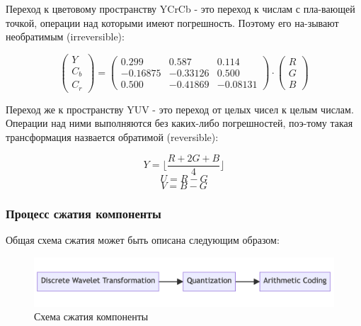 \documentclass[a4paper]{article}
\begin{document}
  Переход к цветовому пространству YCrCb - это переход к числам с пла-вающей точкой,
  операции над которыми имеют погрешность. Поэтому его на-зывают необратимым (irreversible):

  \begin{equation}
    \begin{pmatrix}
      Y \\ C_b \\ C_r
    \end{pmatrix} = \begin{pmatrix}
      0.299 & 0.587 & 0.114 \\
      -0.16875 & -0.33126 & 0.500 \\
      0.500 & -0.41869 & -0.08131
    \end{pmatrix} \cdot \begin{pmatrix}
      R \\ G \\ B
    \end{pmatrix}
  \end{equation}

  Переход же к пространству YUV - это переход от целых чисел к целым числам. Операции
  над ними выполняются без каких-либо погрешностей, поэ-тому такая трансформация назвается обратимой (reversible):

  \begin{equation}
    Y = \lfloor \frac{R + 2G + B}{4} \rfloor
  \end{equation}
  \begin{equation}
    U = R - G
  \end{equation}
  \begin{equation}
    V = B - G
  \end{equation}

  \subsubsection{Процесс сжатия компоненты}

  Общая схема сжатия может быть описана следующим образом:
  \begin{figure}[H]
    \centering
    \includegraphics[width=\textwidth]{ct.png}
    \caption[short]{Схема сжатия компоненты}
  \end{figure}
\end{document}
